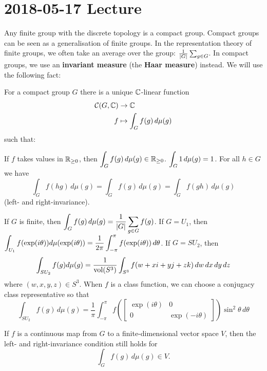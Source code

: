 \section{2018-05-17 Lecture}

Any finite group with the discrete topology is a compact group.
Compact groups can be seen as a generalisation of finite groups.
In the representation theory of finite groups, we often take an average over the group: $\frac{1}{\left\lvert G \right\rvert}\sum_{g \in G}$.
In compact groups, we use an \textbf{invariant measure} (the \textbf{Haar measure}) instead.
We will use the following fact:

\begin{thm}
  For a compact group $G$ there is a unique $\mathbb{C}$-linear function
  \begin{align*}
    \mathcal{C}(G,\mathbb{C}) &\to \mathbb{C} \\
    f &\mapsto \int_G f(g) \, d\mu(g)
  \end{align*}
  such that:
  \begin{enum}
    \io If $f$ takes values in $\mathbb{R}_{\geq 0}$, then $\displaystyle \int_G f(g) \, d\mu(g) \in \mathbb{R}_{\geq 0}$.
    \io $\displaystyle \int_G 1 \, d\mu(g) = 1$.
    \io For all $h \in G$ we have
    \[ \int_G f(hg) \, d\mu(g) = \int_G f(g) \, d\mu(g) = \int_G f(gh) \, d\mu(g) \]
    (left- and right-invariance).
  \end{enum}
\end{thm}

\begin{exam}
  \lv
  \begin{enum}
    \io If $G$ is finite, then $\displaystyle \int_G f(g) \, d\mu(g) = \frac{1}{\left\lvert G \right\rvert} \sum_{g \in G} f(g)$.
    \io If $G=U_1$, then $\displaystyle \int_{U_1} f(\exp(i\theta)) d\mu(\exp(i\theta)) = \frac{1}{2\pi} \int_{-\pi}^\pi f(\exp(i\theta)) \, d\theta$.
    \io If $G=SU_2$, then
    \[ \int_{SU_2} f(g) d\mu(g) = \frac{1}{\operatorname{vol}(S^3)} \int_{S^3} f(w+xi+yj+zk) \, dw \, dx \, dy \, dz \]
    where $(w,x,y,z) \in S^3$.
    When $f$ is a class function, we can choose a conjugacy class representative so that
    \[ \int_{SU_2} f(g) \, d\mu(g) = \frac 1\pi \int_{-\pi}^\pi f \left( 
	\begin{bmatrix}
	  \exp(i\theta) & 0 \\ 0 & \exp(-i\theta)
	\end{bmatrix}
    \right) \sin^2\theta \, d\theta \]
  \end{enum}
\end{exam}

\begin{rmk}
  If $f$ is a continuous map from $G$ to a finite-dimensional vector space $V$, then the left- and right-invariance condition still holds for
  \[ \int_G f(g) \, d\mu(g) \in V. \]
\end{rmk}

